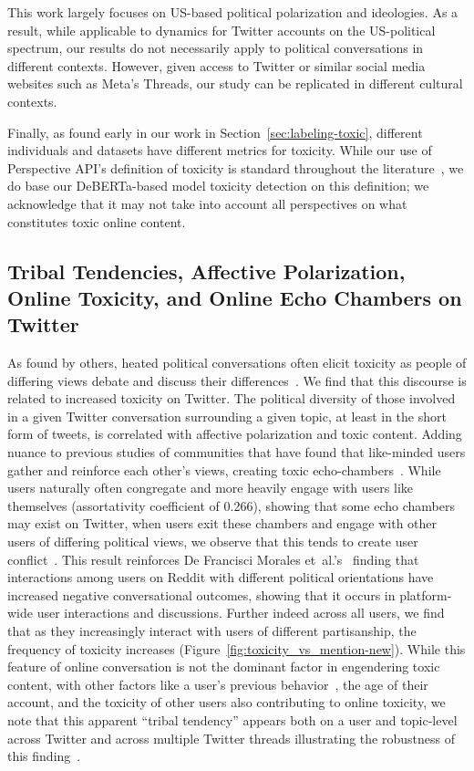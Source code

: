 This work largely focuses on US-based political polarization and ideologies. As a result, while applicable to dynamics for Twitter accounts on the US-political spectrum, our results do not necessarily apply to political conversations in different contexts. However, given access to Twitter or similar social media websites such as Meta's Threads, our study can be replicated in different cultural contexts.

Finally, as found early in our work in Section~\ref{sec:labeling-toxic}, different individuals and datasets have different metrics for toxicity. While our use of Perspective API's definition of toxicity is standard throughout the literature~\cite{kumar2021designing,rajadesingan2020quick,saveski2021structure}, we do base our DeBERTa-based model toxicity detection on this definition; we acknowledge that it may not take into account all perspectives on what constitutes toxic online content. 


\subsection{Tribal Tendencies, Affective Polarization, Online Toxicity, and Online Echo Chambers on Twitter}
As found by others, heated political conversations often elicit toxicity as people of differing views debate and discuss their differences~\cite{salminen2020topic}. We find that this discourse is related to increased toxicity on Twitter. The political diversity of those involved in a given Twitter conversation surrounding a given topic, at least in the short form of tweets, is correlated with affective polarization and toxic content. Adding nuance to previous studies of communities that have found that like-minded users gather and reinforce each other's views, creating toxic echo-chambers~\cite{cinelli2020echo,starbird2018ecosystem,gronlund2015does}. While users naturally often congregate and more heavily engage with users like themselves (assortativity coefficient of 0.266), showing that some echo chambers may exist on Twitter, when users exit these chambers and engage with other users of differing political views, we observe that this tends to create user conflict~\cite{guess2018avoiding}. This result reinforces De Francisci Morales {et~al.}'s~\cite{de2021no} finding that interactions among users on Reddit with different political orientations have increased negative conversational outcomes, showing that it occurs in platform-wide user interactions and discussions. Further indeed across all users, we find that as they increasingly interact with users of different partisanship, the frequency of toxicity increases (Figure~\ref{fig:toxicity_vs_mention-new}). While this feature of online conversation is not the dominant factor in engendering toxic content, with other factors like a user's previous behavior~\cite{levy2022understanding}, the age of their account, and the toxicity of other users also contributing to online toxicity, we note that this apparent ``tribal tendency'' appears both on a user and topic-level across Twitter and across multiple Twitter threads illustrating the robustness of this finding~\cite{mamakos2023social,de2021no}.  

